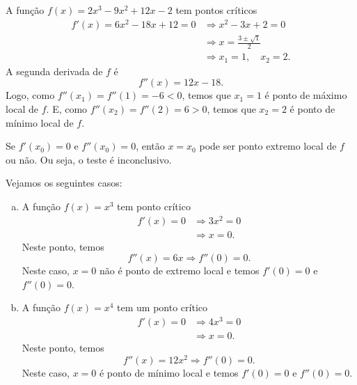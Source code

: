 \begin{ex}
  A função $f(x) = 2x^3 - 9x^2 + 12x - 2$ tem pontos críticos
  \begin{align}
    f'(x) = 6x^2 - 18x + 12 = 0 &\Rightarrow x^2 - 3x + 2 = 0 \\
                                &\Rightarrow x = \frac{3 \pm \sqrt{1}}{2}\\
                                &\Rightarrow x_1 = 1,\quad x_2 = 2.
  \end{align}
  A segunda derivada de $f$ é
  \begin{equation}
    f''(x) = 12x - 18.
  \end{equation}
  Logo, como $f''(x_1) = f''(1) = -6 < 0$, temos que $x_1 = 1$ é ponto de máximo local de $f$. E, como $f''(x_2) = f''(2) = 6 > 0$, temos que $x_2 = 2$ é ponto de mínimo local de $f$.
\end{ex}

\begin{obs}
  Se $f'(x_0) = 0$ e $f''(x_0) = 0$, então $x=x_0$ pode ser ponto extremo local de $f$ ou não. Ou seja, o teste é inconclusivo.
\end{obs}

\begin{ex}
  Vejamos os seguintes casos:
  \begin{enumerate}[a)]
  \item A função $f(x) = x^3$ tem ponto crítico
    \begin{align}
      f'(x) = 0 &\Rightarrow 3x^2 = 0 \\
                &\Rightarrow x = 0.
    \end{align}
    Neste ponto, temos
    \begin{equation}
      f''(x) = 6x \Rightarrow f''(0) = 0.
    \end{equation}
    Neste caso, $x=0$ não é ponto de extremo local e temos $f'(0) = 0$ e $f''(0) = 0$.
  \item A função $f(x) = x^4$ tem um ponto crítico
    \begin{align}
      f'(x) = 0 &\Rightarrow 4x^3 = 0 \\
                &\Rightarrow x = 0.
    \end{align}
    Neste ponto, temos
    \begin{equation}
      f''(x) = 12x^2 \Rightarrow f''(0) = 0.
    \end{equation}
    Neste caso, $x=0$ é ponto de mínimo local e temos $f'(0)=0$ e $f''(0) = 0$.
  \end{enumerate}
\end{ex}

